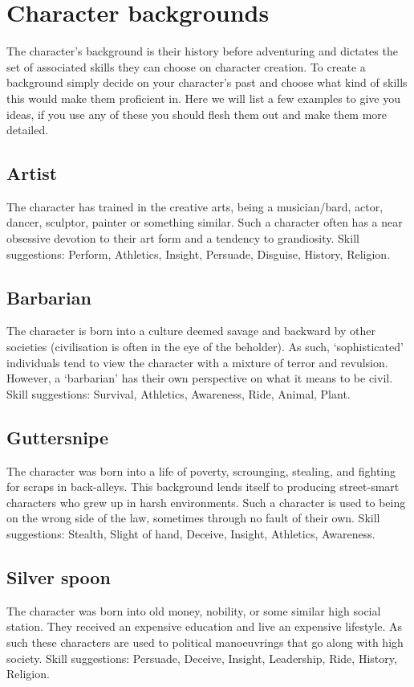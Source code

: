 \documentclass[a4paper,10pt,oneside]{book}
\begin{document}
\section{Character backgrounds}
\label{sec:backgrounds}
The character's background is their history before adventuring and dictates the set of associated skills they can choose on character creation. To create a background simply decide on your character's past and choose what kind of skills this would make them proficient in. Here we will list a few examples to give you ideas, if you use any of these you should flesh them out and make them more detailed.

\subsection{Artist}
The character has trained in the creative arts, being a musician/bard, actor, dancer, sculptor, painter or something similar. Such a character often has a near obsessive devotion to their art form and a tendency to grandiosity. Skill suggestions: Perform, Athletics, Insight, Persuade, Disguise, History, Religion.

\subsection{Barbarian}
The character is born into a culture deemed savage and backward by other societies (civilisation is often in the eye of the beholder). As such, `sophisticated' individuals tend to view the character with a mixture of terror and revulsion. However, a `barbarian' has their own perspective on what it means to be civil. Skill suggestions: Survival, Athletics, Awareness, Ride, Animal, Plant.

\subsection{Guttersnipe}
The character was born into a life of poverty, scrounging, stealing, and fighting for scraps in back-alleys. This background lends itself to producing street-smart characters who grew up in harsh environments. Such a character is used to being on the wrong side of the law, sometimes through no fault of their own. Skill suggestions: Stealth, Slight of hand, Deceive, Insight, Athletics, Awareness.

\subsection{Silver spoon}
The character was born into old money, nobility, or some similar high social station. They received an expensive education and live an expensive lifestyle. As such these characters are used to political manoeuvrings that go along with high society. Skill suggestions: Persuade, Deceive, Insight, Leadership, Ride, History, Religion.
\end{document}
